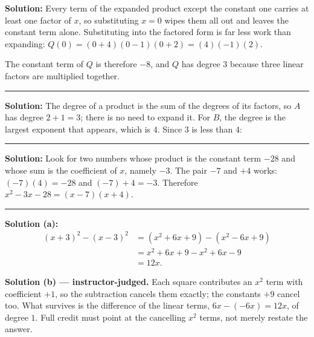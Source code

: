 \documentclass[12pt]{article}
\begin{document}

\textbf{Solution:} \quad Every term of the expanded product except the constant one carries at
least one factor of $x$, so substituting $x=0$ wipes them all out and leaves the constant term
alone. Substituting into the factored form is far less work than expanding:
$Q(0) = (0+4)(0-1)(0+2) = (4)(-1)(2)$. 

\noindent The constant term of $Q$ is therefore $-8$, and $Q$ has degree $3$ because three
linear factors are multiplied together.

\vspace{0.2cm}\noindent\rule{\linewidth}{0.2pt}


\textbf{Solution:} \quad The degree of a product is the sum of the degrees of its factors, so
$A$ has degree $2 + 1 = 3$; there is no need to expand it. For $B$, the degree is the largest
exponent that appears, which is $4$. Since $3$ is less than $4$: \ans{<}

\vspace{0.2cm}\noindent\rule{\linewidth}{0.2pt}


\textbf{Solution:} \quad Look for two numbers whose product is the constant term $-28$ and whose
sum is the coefficient of $x$, namely $-3$. The pair $-7$ and $+4$ works:
$(-7)(4) = -28$ and $(-7) + 4 = -3$. Therefore
$x^2 - 3x - 28 = (x-7)(x+4)$. 

\vspace{0.2cm}\noindent\rule{\linewidth}{0.2pt}


\textbf{Solution (a):}
\begin{align*}
  (x+3)^2 - (x-3)^2 &= (x^2 + 6x + 9) - (x^2 - 6x + 9)\\
                    &= x^2 + 6x + 9 - x^2 + 6x - 9\\
                    &= 12x.
\end{align*}

\noindent\textbf{Solution (b) --- instructor-judged.} Each square contributes an $x^2$ term with
coefficient $+1$, so the subtraction cancels them exactly; the constants $+9$ cancel too. What
survives is the difference of the linear terms, $6x - (-6x) = 12x$, of degree $1$. Full credit
must point at the cancelling $x^2$ terms, not merely restate the answer.
\end{document}
